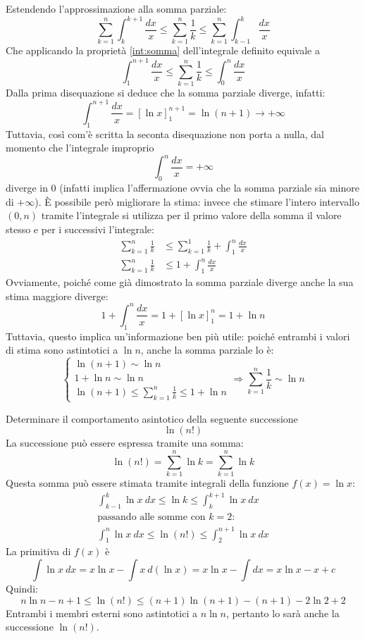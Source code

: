 Estendendo l'approssimazione alla somma parziale:
\[
	\sum_{k=1}^n \int_k^{k+1} \frac{dx}{x}\leq \sum_{k=1}^n \frac{1}{k}\leq \sum_{k=1}^n \int_{k-1}^k \frac{dx}{x}
\]
Che applicando la proprietà \ref{int:somma} dell'integrale definito equivale a
\[
	\int_1^{n+1}\frac{dx}{x}\leq \sum_{k=1}^n \frac{1}{k} \leq \int_0^n\frac{dx}{x}
\]
Dalla prima disequazione si deduce che la somma parziale diverge, infatti:
\[
	\int_1^{n+1}\frac{dx}{x}=[\ln x]_1^{n+1}=\ln (n+1)\to+\infty
\]
Tuttavia, così com'è scritta la seconta disequazione non porta a nulla, dal momento che l'integrale improprio
\[
	\int_0^n\frac{dx}{x}=+\infty
\]
diverge in $0$ (infatti implica l'affermazione ovvia che la somma parziale sia minore di $+\infty$). È possibile però migliorare la stima: invece che stimare l'intero intervallo $(0,n)$ tramite l'integrale si utilizza per il primo valore della somma il valore stesso e per i successivi l'integrale:
\begin{align*}
	\sum_{k=1}^n \frac{1}{k} & \leq \sum_{k=1}^1 \frac{1}{k}+\int_1^n\frac{dx}{x} \\
	\sum_{k=1}^n \frac{1}{k} & \leq 1+\int_1^n\frac{dx}{x}
\end{align*}
Ovviamente, poiché come già dimostrato la somma parziale diverge anche la sua stima maggiore diverge:
\[
	1+\int_1^n\frac{dx}{x}=1+[\ln x]_1^n=1+\ln n
\]
Tuttavia, questo implica un'informazione ben più utile: poiché entrambi i valori di stima sono astintotici a $\ln n$, anche la somma parziale lo è:
\[
	\begin{cases}
		\ln(n+1)\sim \ln n \\
		1+\ln n\sim \ln n  \\
		\ln(n+1)\leq\sum_{k=1}^n \frac{1}{k}\leq 1+\ln n
	\end{cases}\Rightarrow
	\sum_{k=1}^n \frac{1}{k}\sim \ln n
\]

\begin{examp}
	Determinare il comportamento asintotico della seguente successione
	\[
		\ln(n!)
	\]
	La successione può essere espressa tramite una somma:
	\[
		\ln(n!)=\sum_{k=1}^n \ln k=\sum_{k=1}^n \ln k
	\]
	Questa somma può essere stimata tramite integrali della funzione $f(x)=\ln x$:
	\begin{gather*}
		\int_{k-1}^k \ln x ~dx\leq \ln k \leq \int_k^{k+1} \ln x ~dx\\
		\text{passando alle somme con $k=2$:}\\
		\int_1^n \ln x ~dx\leq \ln(n!) \leq \int_2^{n+1} \ln x ~dx
	\end{gather*}
	La primitiva di $f(x)$ è
	\[
		\int \ln x ~dx=x\ln x -\int x ~d(\ln x)=x\ln x -\int dx=x\ln x -x +c
	\]
	Quindi:
	\[
		n \ln n -n+1 \leq \ln(n!) \leq (n+1)\ln(n+1)-(n+1)-2\ln 2+2
	\]
	Entrambi i membri esterni sono astintotici a $n\ln n$, pertanto lo sarà anche la successione $\ln(n!)$.
\end{examp}

